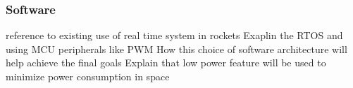 \subsubsection{Software}

reference to existing use of real time system in rockets
Exaplin the RTOS
and using MCU peripherals like PWM
How this choice of software architecture will help achieve the final goals
Explain that low power feature will be used to minimize power consumption in space